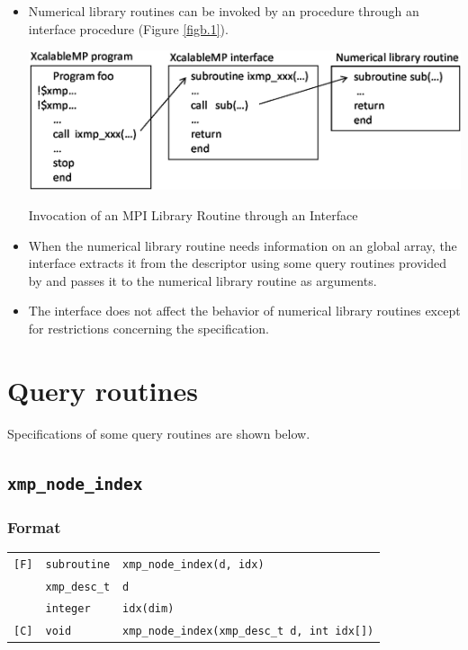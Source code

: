 \begin{itemize}

 \item Numerical library routines can be invoked by an {\XMP} procedure
       through an interface procedure (Figure \ref{figb.1}).

 \begin{myfigure}
  \includegraphics[scale=0.7]{figs/figb.1.eps}
  \caption{Invocation of an MPI Library Routine through an Interface}
  \label{figb.1}
 \end{myfigure}

 \item When the numerical library routine needs information on an global
       array, the interface extracts it from the descriptor using some
       query routines provided by {\XMP} and passes it to the
       numerical library routine as arguments.
%
 \item The interface does not affect the behavior of numerical library
       routines except for restrictions concerning the {\XMP}
       specification.
\end{itemize}


\section{Query routines}

Specifications of some query routines are shown below.

\subsection{\tt xmp\_node\_index}

\subsubsection*{Format}

\begin{tabular}{lll}

\verb![F]!& {\tt subroutine}& {\tt xmp\_node\_index(d, idx)}\\
          & {\tt xmp\_desc\_t} & {\tt d}\\
          & {\tt integer} & {\tt idx(dim)}\\

\verb![C]!&  {\tt void}& {\tt xmp\_node\_index(xmp\_desc\_t d, int idx[])}\\

\end{tabular}

